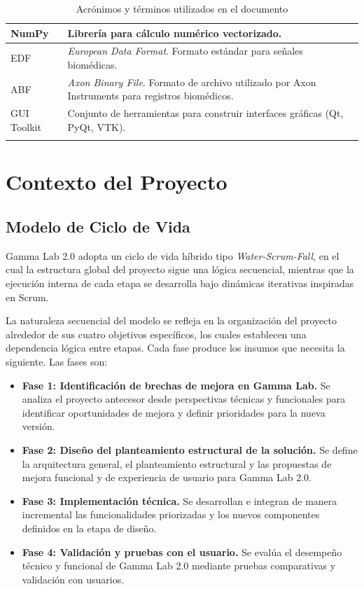 \documentclass{article}
\begin{document}
\begin{longtable}{|p{3.5cm}|p{10.5cm}|}
NumPy & Librería para cálculo numérico vectorizado. \\
\hline

EDF & \textit{European Data Format}. Formato estándar para señales biomédicas. \\
\hline

ABF & \textit{Axon Binary File}. Formato de archivo utilizado por Axon Instruments para registros biomédicos. \\
\hline

GUI Toolkit & Conjunto de herramientas para construir interfaces gráficas (Qt, PyQt, VTK). \\
\hline
\caption{Acrónimos y términos utilizados en el documento} \label{tab:acronimos} \\
\end{longtable}


\section{Contexto del Proyecto}

\subsection{Modelo de Ciclo de Vida}
Gamma Lab 2.0 adopta un ciclo de vida híbrido tipo \textit{Water-Scrum-Fall}, en el cual la estructura global del proyecto sigue una lógica secuencial, mientras que la ejecución interna de cada etapa se desarrolla bajo dinámicas iterativas inspiradas en Scrum.

La naturaleza secuencial del modelo se refleja en la organización del proyecto alrededor de sus cuatro objetivos específicos, los cuales establecen una dependencia lógica entre etapas. Cada fase produce los insumos que necesita la siguiente. Las fases son:

\begin{itemize}[label={}]
    \item \textbf{Fase 1: Identificación de brechas de mejora en Gamma Lab.} 
    Se analiza el proyecto antecesor desde perspectivas técnicas y funcionales para identificar oportunidades de mejora y definir prioridades para la nueva versión.

    \item \textbf{Fase 2: Diseño del planteamiento estructural de la solución.} 
    Se define la arquitectura general, el planteamiento estructural y las propuestas de mejora funcional y de experiencia de usuario para Gamma Lab 2.0.

    \item \textbf{Fase 3: Implementación técnica.} 
    Se desarrollan e integran de manera incremental las funcionalidades priorizadas y los nuevos componentes definidos en la etapa de diseño.

    \item \textbf{Fase 4: Validación y pruebas con el usuario.} 
    Se evalúa el desempeño técnico y funcional de Gamma Lab 2.0 mediante pruebas comparativas y validación con usuarios.
\end{itemize}
\end{document}
